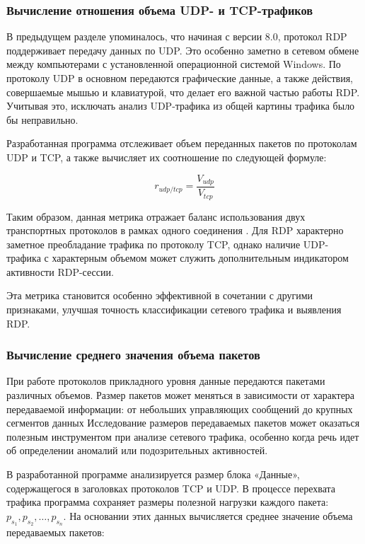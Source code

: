 \documentclass[spec, och, diploma]{SCWorks}
\begin{document}
\subsubsection{Вычисление отношения объема UDP- и TCP-трафиков}

В предыдущем разделе упоминалось, что начиная с версии 8.0, протокол RDP поддерживает передачу данных по UDP. Это особенно заметно в 
сетевом обмене между компьютерами с установленной операционной системой Windows. По протоколу UDP в основном передаются графические данные, 
а также действия, совершаемые мышью и клавиатурой, что делает его важной частью работы RDP. Учитывая это, исключать анализ UDP-трафика из 
общей картины трафика было бы неправильно.

Разработанная программа отслеживает объем переданных пакетов по протоколам UDP и TCP, а также вычисляет их соотношение по следующей формуле:

\begin{equation}
  r_{udp/tcp} = \frac{V_{udp}}{V_{tcp}}
\end{equation}

Таким образом, данная метрика отражает баланс использования двух транспортных протоколов в рамках одного соединения \cite{lib1}. Для RDP характерно 
заметное преобладание трафика по протоколу TCP, однако наличие UDP-трафика с характерным объемом может служить дополнительным индикатором 
активности RDP-сессии.

Эта метрика становится особенно эффективной в сочетании с другими признаками, улучшая точность классификации сетевого трафика и выявления RDP.

\subsubsection{Вычисление среднего значения объема пакетов}

При работе протоколов прикладного уровня данные передаются пакетами различных объемов. 
Размер пакетов может меняться в зависимости от характера передаваемой информации: от небольших управляющих сообщений до крупных сегментов данных
Исследование размеров передаваемых пакетов может оказаться полезным инструментом при анализе сетевого 
трафика, особенно когда речь идет об определении аномалий или подозрительных активностей.


В разработанной программе анализируется размер блока «Данные», содержащегося в заголовках протоколов TCP и UDP. В процессе перехвата 
трафика программа сохраняет размеры полезной нагрузки каждого пакета: \\ $p_{s_1}, p_{s_2}, \dots, p_{s_n}$. На основании этих данных 
вычисляется среднее значение объема передаваемых пакетов:
\end{document}
